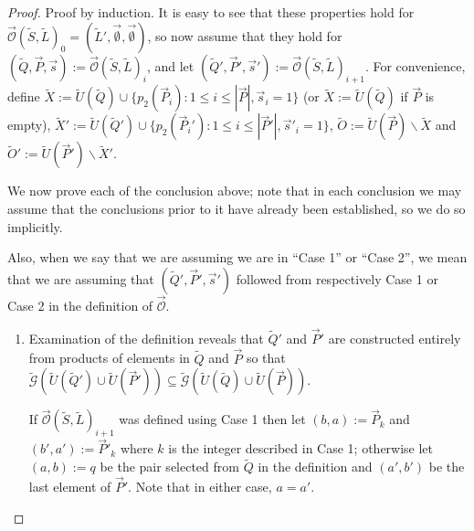 \documentclass[12pt]{amsbook}
\theoremstyle{plain}
\theoremstyle{definition}
\theoremstyle{remark}
\newcommand{\lst}{\vec}
\newcommand{\set}{\tilde}
\newcommand{\genfun}{\tilde{\mathcal{G}}}
\newcommand{\unpack}{\set U}
\newcommand{\optimizer}{\lst{\mathcal{O}}}
\newcommand{\paren}[1]{\left(#1\right)}
\begin{document}
\begin{proof}
Proof by induction.  It is easy to see that these properties hold for $\optimizer(\set S,\set L)_0=(\set L',\lst\emptyset,\lst\emptyset)$, so now assume that they hold for $(\set Q,\lst P,\lst s):=\optimizer(\set S,\set L)_i$, and let $(\set Q',\lst P',\lst s'):=\optimizer(\set S,\set L)_{i+1}$.  For convenience, define $\set X:=\unpack(\set Q)\cup\{p_2(\lst P_i):1 \le i \le |\lst P|, \lst s_i=1\}$ (or $\set X:=\unpack(\set Q)$ if $\lst P$ is empty), $\set X':=\unpack(\set Q')\cup\{p_2(\lst P_i'):1 \le i \le |\lst P'|, \lst s'_i=1\}$, $\set O:=\unpack(\lst P)\backslash\set X$ and $\set O':=\unpack(\lst P')\backslash\set X'$.

We now prove each of the conclusion above;  note that in each conclusion we may assume that the conclusions prior to it have already been established, so we do so implicitly.

Also, when we say that we are assuming we are in ``Case 1'' or ``Case 2'', we mean that we are assuming that $(\set Q',\lst P',\lst s')$ followed from respectively Case 1 or Case 2 in the definition of $\optimizer$.

\begin{enumerate}
\item

Examination of the definition reveals that $\set Q'$ and $\lst P'$ are constructed entirely from products of elements in $\set Q$ and $\lst P$ so that $\genfun\paren{\set U(\set Q')\cup\set U(\lst P')}\subseteq\genfun\paren{\set U(\set Q)\cup\set U(\lst P)}$.

If $\optimizer(\set S,\set L)_{i+1}$ was defined using Case 1 then let $(b,a):=\lst P_k$ and $(b',a'):=\lst P'_k$ where $k$ is the integer described in Case 1;  otherwise let $(a,b):=q$ be the pair selected from $\set Q$ in the definition and $(a',b')$ be the last element of $\lst P'$.  Note that in either case, $a=a'$.


\end{enumerate}
\end{proof}
\end{document}
